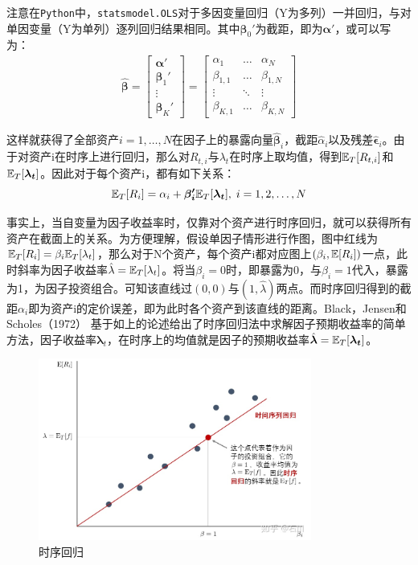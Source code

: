 \documentclass[11pt]{article}
\begin{document}
注意在\verb|Python|中，\verb|statsmodel.OLS|对于多因变量回归（Y为多列）一并回归，与对单因变量（Y为单列）逐列回归结果相同。其中$\bm{\beta}_{0}'$为截距，即为$\bm{\alpha}'$，或可以写为：
\begin{gather*}
    \hat{\bm{\beta}}
    = \begin{bmatrix} \bm{\alpha}' \\ \bm{\beta}_{1}' \\ \vdots \\ \bm{\beta}_{K}' \end{bmatrix}
    = \begin{bmatrix} \alpha_{1} & \dots & \alpha_{N} \\ \beta_{1,1} & \dots & \beta_{1,N} \\ \vdots & \ddots & \vdots \\ \beta_{K,1} & \dots & \beta_{K,N} \end{bmatrix}
\end{gather*}

这样就获得了全部资产$i=1,\dots,N$在因子上的暴露向量$\hat{\bm{\beta}}_i$，截距$\hat{\alpha}_i$以及残差$\hat{\bm{\epsilon}}_i$。由于对资产i在时序上进行回归，那么对$R_{t,i}$与$\lambda_t$在时序上取均值，得到$\mathbb{E}_T[R_{t,i}]$和$\mathbb{E}_T[\bm{\lambda_t}]$。因此对于每个资产i，都有如下关系：
\begin{equation*}
    \mathbb{E}_T[R_i] = \alpha_i + \bm{\beta_{i}'} \mathbb{E}_T[\bm{\lambda_t}] ,\; i=1,2,\dots,N
\end{equation*}

事实上，当自变量为因子收益率时，仅靠对个资产进行时序回归，就可以获得所有资产在截面上的关系。为方便理解，假设单因子情形进行作图，图中红线为$\mathbb{E}_T[R_i] = \beta_i \mathbb{E}_T[\lambda_t]$，那么对于N个资产，每个资产i都对应图上$(\beta_i,\mathbb{E}[R_i])$一点，此时斜率为因子收益率$\hat{\lambda}=\mathbb{E}_T[\lambda_t]$。将当$\beta_i=0$时，即暴露为0，与$\beta_i=1$代入，暴露为1，为因子投资组合。可知该直线过$(0,0)$与$(1,\hat{\lambda})$两点。而时序回归得到的截距$\alpha_i$即为资产i的定价误差，即为此时各个资产到该直线的距离。Black，Jensen和Scholes（1972） 基于如上的论述给出了时序回归法中求解因子预期收益率的简单方法，因子收益率$\bm{\lambda}_t$，在时序上的均值就是因子的预期收益率$\hat{\bm{\lambda}} = \mathbb{E}_T[\bm{\lambda_t}]$。

\begin{figure}[H]
    \centering
    \includegraphics[width=0.8\textwidth]{fig/ts-reg.jpg}
    \caption{时序回归}
    \label{fig:ts-reg}
\end{figure}
\end{document}
